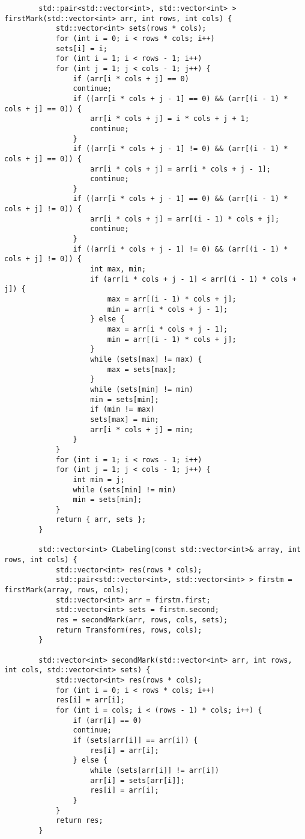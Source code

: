 \documentclass{report}
\begin{document}
\begin{lstlisting}
	    std::pair<std::vector<int>, std::vector<int> > firstMark(std::vector<int> arr, int rows, int cols) {
	    	std::vector<int> sets(rows * cols);
	    	for (int i = 0; i < rows * cols; i++)
	    	sets[i] = i;
	    	for (int i = 1; i < rows - 1; i++)
	    	for (int j = 1; j < cols - 1; j++) {
	    		if (arr[i * cols + j] == 0)
	    		continue;
	    		if ((arr[i * cols + j - 1] == 0) && (arr[(i - 1) * cols + j] == 0)) {
	    			arr[i * cols + j] = i * cols + j + 1;
	    			continue;
	    		}
	    		if ((arr[i * cols + j - 1] != 0) && (arr[(i - 1) * cols + j] == 0)) {
	    			arr[i * cols + j] = arr[i * cols + j - 1];
	    			continue;
	    		}
	    		if ((arr[i * cols + j - 1] == 0) && (arr[(i - 1) * cols + j] != 0)) {
	    			arr[i * cols + j] = arr[(i - 1) * cols + j];
	    			continue;
	    		}
	    		if ((arr[i * cols + j - 1] != 0) && (arr[(i - 1) * cols + j] != 0)) {
	    			int max, min;
	    			if (arr[i * cols + j - 1] < arr[(i - 1) * cols + j]) {
	    				max = arr[(i - 1) * cols + j];
	    				min = arr[i * cols + j - 1];
	    			} else {
	    				max = arr[i * cols + j - 1];
	    				min = arr[(i - 1) * cols + j];
	    			}
	    			while (sets[max] != max) {
	    				max = sets[max];
	    			}
	    			while (sets[min] != min)
	    			min = sets[min];
	    			if (min != max)
	    			sets[max] = min;
	    			arr[i * cols + j] = min;
	    		}
	    	}
	    	for (int i = 1; i < rows - 1; i++)
	    	for (int j = 1; j < cols - 1; j++) {
	    		int min = j;
	    		while (sets[min] != min)
	    		min = sets[min];
	    	}
	    	return { arr, sets };
	    }
	    
	    std::vector<int> CLabeling(const std::vector<int>& array, int rows, int cols) {
	    	std::vector<int> res(rows * cols);
	    	std::pair<std::vector<int>, std::vector<int> > firstm = firstMark(array, rows, cols);
	    	std::vector<int> arr = firstm.first;
	    	std::vector<int> sets = firstm.second;
	    	res = secondMark(arr, rows, cols, sets);
	    	return Transform(res, rows, cols);
	    }
	    
	    std::vector<int> secondMark(std::vector<int> arr, int rows, int cols, std::vector<int> sets) {
	    	std::vector<int> res(rows * cols);
	    	for (int i = 0; i < rows * cols; i++)
	    	res[i] = arr[i];
	    	for (int i = cols; i < (rows - 1) * cols; i++) {
	    		if (arr[i] == 0)
	    		continue;
	    		if (sets[arr[i]] == arr[i]) {
	    			res[i] = arr[i];
	    		} else {
	    			while (sets[arr[i]] != arr[i])
	    			arr[i] = sets[arr[i]];
	    			res[i] = arr[i];
	    		}
	    	}
	    	return res;
	    }
	    

\end{lstlisting}
\end{document}
